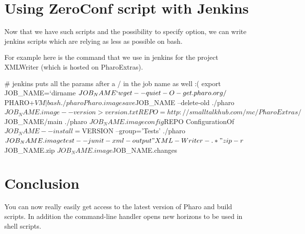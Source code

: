 \documentclass[a4paper,10pt,twoside]{book}
\begin{document}
\section{Using ZeroConf script with Jenkins}
Now that we have such scripts and the possibility to specify option, we can write jenkins scripts which are relying as less as possible on bash. 

For example here is the command that we use in jenkins for the project XMLWriter (which is hosted on PharoExtras). 

\begin{code}{}
# jenkins puts all the params after a / in the job name as well :(
export JOB_NAME=`dirname $JOB_NAME`

wget --quiet -O - get.pharo.org/$PHARO+$VM | bash

./pharo Pharo.image save $JOB_NAME --delete-old
./pharo $JOB_NAME.image --version > version.txt

REPO=http://smalltalkhub.com/mc/PharoExtras/$JOB_NAME/main
./pharo $JOB_NAME.image config $REPO ConfigurationOf$JOB_NAME --install=$VERSION --group='Tests'
./pharo $JOB_NAME.image test --junit-xml-output "XML-Writer-.*"

zip -r $JOB_NAME.zip $JOB_NAME.image $JOB_NAME.changes
\end{code}

\section{Conclusion}
You can now really easily get access to the latest version of Pharo and build scripts. In addition the 
command-line handler opens new horizons to be used in shell scripts.

\ifx\wholebook\relax\else
   
   
\end{document}
